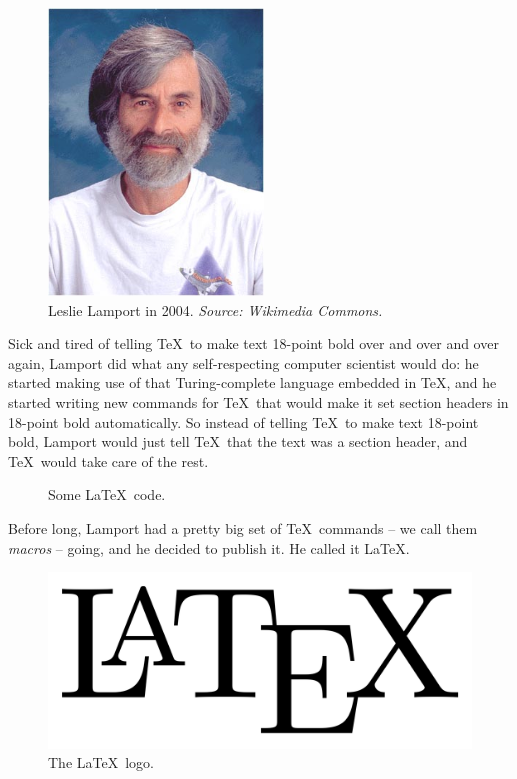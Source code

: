 \documentclass[ignorenonframetext]{beamer}
\begin{document}
\begin{frame}
  \begin{figure}
    \centering
    \includegraphics[height=3in]{images/lamport.jpg}
    \caption{Leslie Lamport in 2004.  \emph{Source: Wikimedia Commons.}}
    \label{fig:lamport}
  \end{figure}
\end{frame}

Sick and tired of telling \TeX\ to make text 18-point bold over and
over and over again, Lamport did what any self-respecting computer
scientist would do: he started making use of that Turing-complete
language embedded in \TeX, and he started writing new commands for
\TeX\ that would make it set section headers in 18-point bold
automatically.  So instead of telling \TeX\ to make text 18-point
bold, Lamport would just tell \TeX\ that the text was a section
header, and \TeX\ would take care of the rest.

\begin{frame}
  \begin{figure}
    \centering
    \footnotesize
    \lstset{language=[LaTeX]TeX}
    
   \caption{Some \LaTeX\ code.}
    \label{fig:latexcode}
  \end{figure}
\end{frame}


Before long, Lamport had a pretty big set of \TeX\ commands -- we call
them \emph{macros} -- going, and he decided to publish it.  He called
it \LaTeX.

\begin{frame}
  \begin{figure}
    \centering
    \includegraphics[width=4.5in]{images/latex.png}
    \caption{The \LaTeX\ logo.}
    \label{fig:latexlogo}
  \end{figure}
\end{frame}
\end{document}
